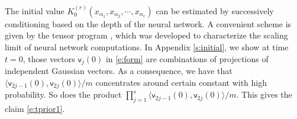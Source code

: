 \documentclass{article}
\numberwithin{equation}{section}
\newcommand{\fD}{{\frak D}}
\newcommand{\sfv}{{\mathsf v}}
\newcommand{\al}{\alpha}
\DeclareMathOperator{\diag}{diag}
\renewcommand{\leq}{\leqslant}
\newcommand{\cor}{\color{darkred}}
\newcommand{\cob}{\color{darkblue}}
\newcommand{\nc}{\normalcolor}
\newcommand{\1}{\mathds{1}}
\theoremstyle{plain} %
\begin{document}
%





The initial value $K_0^{(r)}(x_{\al_1}, x_{\al_2}, \cdots, x_{\al_r})$ can be estimated  by successively conditioning based on the depth of the neural network. A convenient scheme is given by the tensor program \cite{DBLP:journals/corr/abs-1902-04760},  
which was developed to characterize the scaling limit of neural network computations. In Appendix \ref{s:initial}, we show at time $t=0$, those vectors $\sfv_j(0)$ in \eqref{e:form} are combinations of projections of independent Gaussian vectors. As a consequence, we have that $\langle \sfv_{2j-1}(0), \sfv_{2j}(0)\rangle/m$ concentrates around certain constant with high probability. So does the product $\prod_{j=1}^s \langle \sfv_{2j-1}(0), \sfv_{2j}(0)\rangle/m$. This gives the claim \eqref{e:tprior1}. 
\end{document}
